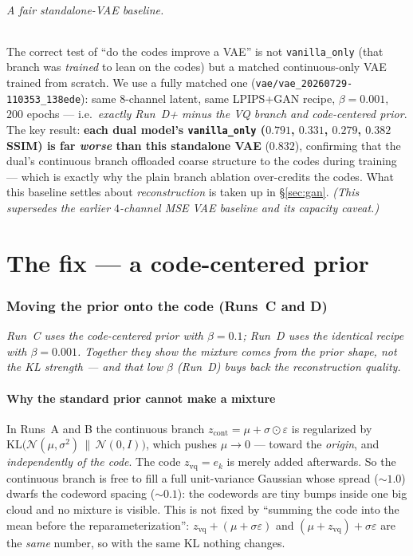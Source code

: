 \documentclass[11pt]{article}
\begin{document}
\paragraph{A fair standalone-VAE baseline.} The correct test of ``do the codes
improve a VAE'' is not \texttt{vanilla\_only} (that branch was \emph{trained} to lean on the
codes) but a matched continuous-only VAE trained from scratch. We use a fully matched one
(\texttt{vae/vae\_20260729-110353\_138ede}): same $8$-channel latent, same LPIPS+GAN recipe,
$\beta{=}0.001$, $200$ epochs --- i.e.\ \emph{exactly Run~D+ minus the VQ branch and code-centered
prior}. The key result: \textbf{each dual model's \texttt{vanilla\_only} ($0.791$, $0.331$, $0.279$,
$0.382$ SSIM) is far \emph{worse} than this standalone VAE} ($0.832$), confirming that the dual's
continuous branch offloaded coarse structure to the codes during training --- which is exactly why
the plain branch ablation over-credits the codes. What this baseline settles about
\emph{reconstruction} is taken up in \S\ref{sec:gan}. \emph{(This supersedes the earlier
$4$-channel MSE VAE baseline and its capacity caveat.)}

\part{The fix --- a code-centered prior}

\section{Moving the prior onto the code (Runs~C and D)}
\label{sec:codeprior}
\emph{Run~C uses the code-centered prior with $\beta=0.1$; Run~D uses the identical recipe with
$\beta=0.001$. Together they show the mixture comes from the prior \emph{shape}, not the KL
strength --- and that low $\beta$ (Run~D) buys back the reconstruction quality.}

\subsection*{Why the standard prior cannot make a mixture}
In Runs~A and B the continuous branch $z_{\text{cont}}=\mu+\sigma\odot\varepsilon$ is
regularized by $\mathrm{KL}\!\big(\mathcal{N}(\mu,\sigma^2)\,\|\,\mathcal{N}(0,I)\big)$, which
pushes $\mu\to 0$ --- toward the \emph{origin}, and \emph{independently of the code}. The code
$z_{\text{vq}}=e_k$ is merely added afterwards. So the continuous branch is free to fill a
full unit-variance Gaussian whose spread ($\sim\!1.0$) dwarfs the codeword spacing
($\sim\!0.1$): the codewords are tiny bumps inside one big cloud and no mixture is visible.
This is not fixed by ``summing the code into the mean before the reparameterization'':
$z_{\text{vq}}+(\mu+\sigma\varepsilon)$ and $(\mu+z_{\text{vq}})+\sigma\varepsilon$ are the
\emph{same} number, so with the same KL nothing changes.
\end{document}
